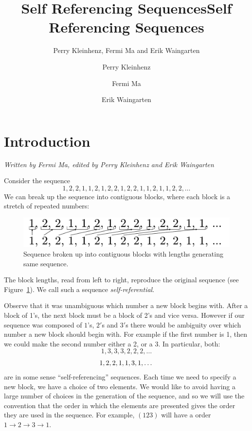 \documentclass[runningheads,a4paper]{llncs}
\title{Self Referencing Sequences}
\author{Perry Kleinhenz, Fermi Ma and Erik Waingarten}
\date{}							%
\begin{document}
\title{Self Referencing Sequences}

\author{Perry Kleinhenz \and Fermi Ma \and Erik Waingarten}
%


\maketitle

\section{Introduction}

\emph{Written by Fermi Ma, edited by Perry Kleinhenz and Erik Waingarten}

Consider the sequence
\begin{equation}
\label{eq:onetwo}
1,2,2,1,1,2,1,2,2,1,2,2,1,1,2,1,1,2,2,\dots
\end{equation}
We can break up the sequence into contiguous blocks, where each block is a stretch of repeated numbers:
\begin{figure}
\label{fig:sequenceblocks}
\center
\includegraphics[width=0.5\linewidth]{sequenceBlocks.pdf}
\caption{Sequence broken up into contiguous blocks with lengths generating same sequence.}
\end{figure}

The block lengths, read from left to right, reproduce the original sequence (see Figure~\ref{fig:sequenceblocks}). We call such a sequence \emph{self-referential}. 

Observe that it was unambiguous which number a new block begins with. After a block of 1's, the next block must be a block of 2's and vice versa. However if our sequence was composed of $1$'s, $2'$s and $3'$s there would be ambiguity over which number a new block should begin with. 
For example if the first number is 1, then we could make the second number either a 2, or a 3. In particular, both:
\begin{equation}
1, 3, 3, 3, 2, 2, 2, \dots
\end{equation}
\begin{equation}
1, 2, 2, 1, 1, 3, 1, \dots\\
\end{equation}
are in some sense ``self-referencing'' sequences.
Each time we need to specify a new block, we have a choice of two elements. We would like to avoid having a large number of choices in the generation of the sequence, and so we will use the convention that the order in which the elements are presented gives the order they are used in the sequence. 
For example, $(123 )$ will have a order $1 \rightarrow 2 \rightarrow 3 \rightarrow 1$. 
\end{document}
